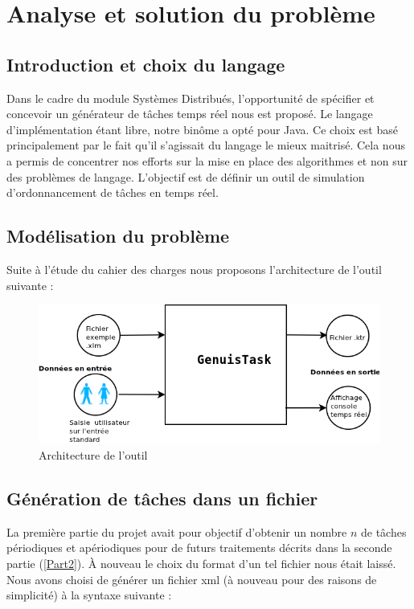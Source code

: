 \chapter{Analyse et solution du problème}

\section{Introduction et choix du langage}
Dans le cadre du module Systèmes Distribués, l'opportunité de  spécifier et concevoir  un générateur de tâches temps réel nous est proposé. Le langage d'implémentation étant libre, notre binôme a opté pour Java. Ce choix est basé principalement par le fait qu'il s'agissait du langage le mieux maitrisé. Cela nous a permis de concentrer nos efforts sur la mise en place des algorithmes et non sur des problèmes de langage.
 L'objectif est de définir un outil de simulation  d'ordonnancement de tâches en temps réel.

\section{Modélisation du problème}
Suite à l'étude du cahier des charges nous proposons l'architecture de l'outil suivante :
   \begin{figure}[htbp]
  \centering
  \includegraphics[scale=0.70]{img/archi}
  \caption{Architecture de l'outil}
  \label{fig:archi}
\end{figure}
\section[Génération de tâches dans un fichier]{Génération de tâches dans un fichier%
}
La première partie du projet avait pour objectif d'obtenir un nombre $n$ de tâches périodiques et apériodiques pour de futurs traitements décrits dans la seconde partie (\ref{Part2}). \`A nouveau le choix du format d'un tel fichier nous était laissé. Nous avons choisi de générer un fichier xml (à nouveau pour des raisons  de simplicité) à la syntaxe suivante : 

